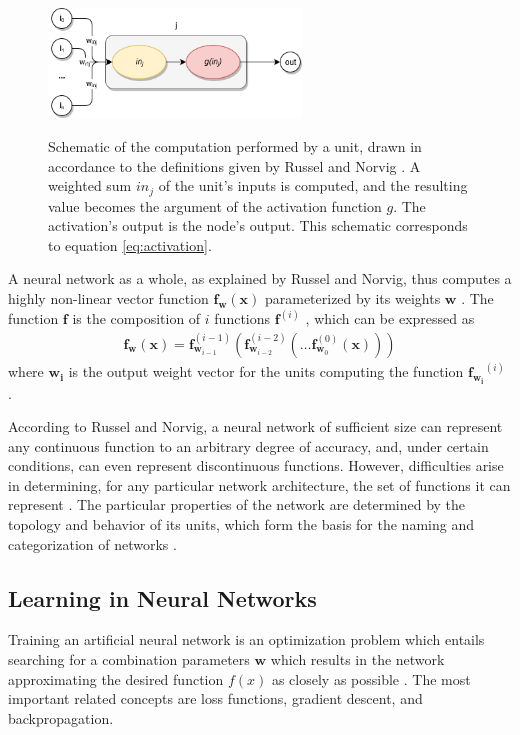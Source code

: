 \documentclass[12pt, titlepage]{report}
\theoremstyle{definition}
\begin{document}
\begin{figure}
\centering
\includegraphics[width=0.6\textwidth]{img/neuron.png}\\
\caption{Schematic of the computation performed by a unit, drawn in accordance to the definitions given by Russel and Norvig \cite[p.728]{russel2009artificial}. A weighted sum $in_j$ of the unit's inputs is computed, and the resulting value becomes the argument of the activation function $g$. The activation's output is the node's output. This schematic corresponds to equation \ref{eq:activation}.}
\label{figure:neural_unit}
\end{figure}

A neural network as a whole, as explained by Russel and Norvig, thus computes a highly non-linear vector function $\bm{f}_{\bm{w}}(\bm{x})$ parameterized by its weights $\bm{w}$ \cite[p. 731, 732]{russel2009artificial}. The function $\bm{f}$ is the composition of $i$ functions $\bm{f}^{(i)}$ \cite[p. 164]{goodfellow2016deep}, which can be expressed as
 \begin{gather}\label{eq:neural_net_composition}
 \bm{f_w}(\bm{x}) = \bm{f}_{\bm{w}_{i-1}}^{(i-1)} (\bm{f}_{\bm{w}_{i-2}}^{(i-2)} ( \ldots \bm{f}_{\bm{w}_{0}}^{(0)}(\bm{x})))
\end{gather}
where $\bm{w_i}$ is the output weight vector for the units computing the function $\bm{f_{w_i}}^{(i)}$ \cite{goodfellow2016deep}.

According to Russel and Norvig, a neural network of sufficient size can represent any continuous function to an arbitrary degree of accuracy, and, under certain conditions, can even represent discontinuous functions. However, difficulties arise in determining, for any particular network architecture, the set of functions it can represent \cite[p. 732]{russel2009artificial}. The particular properties of the network are determined by the topology and behavior of its units, which form the basis for the naming and categorization of networks \cite[p. 729]{russel2009artificial}. 



\subsection{Learning in Neural Networks}
Training an artificial neural network is an optimization problem which entails searching for a combination parameters $\bm{w}$ which results in the network approximating the desired function $f(x)$ as closely as possible \cite[p. 718]{russel2009artificial}. The most important related concepts are loss functions, gradient descent, and backpropagation.
\end{document}
